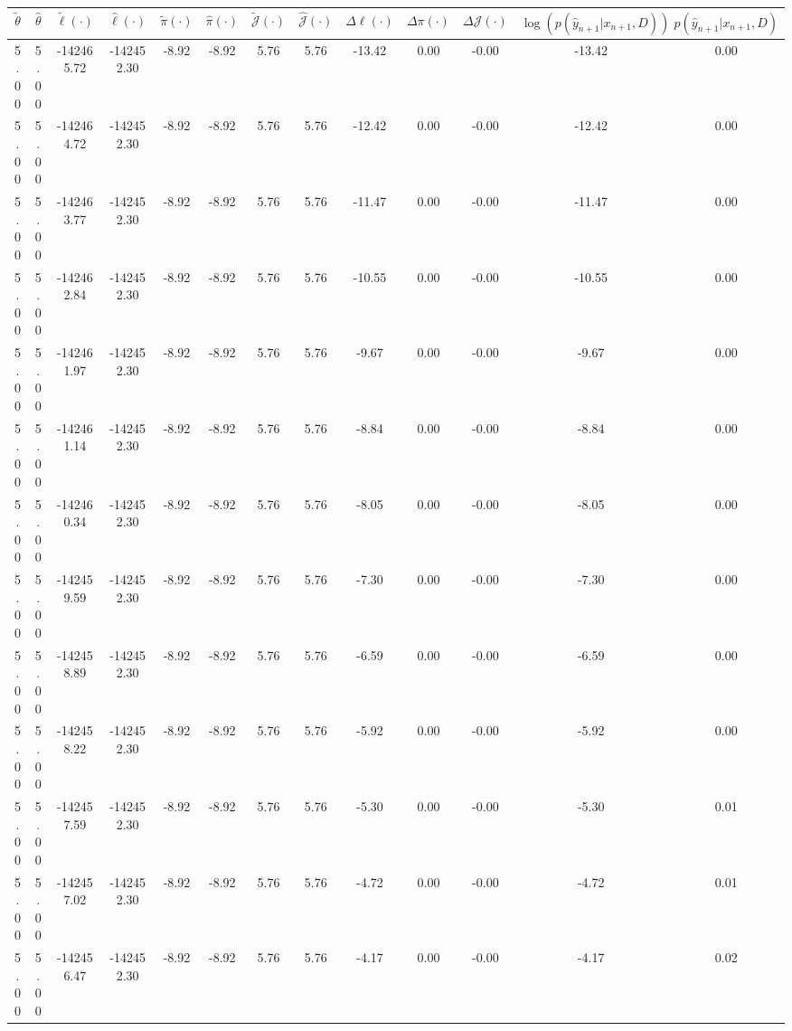 \begin{table}[htbp]
        \centering
        \tiny
        \begin{adjustbox}{angle=90}
            \begin{tabular}{|c|c|c|c|c|c|c|c|c|c|c|c|c|}
                \hline
                 $\tilde{\theta}$ & $\hat{\theta}$ & $\tilde{\ell}(\cdot)$ & $\hat{\ell}(\cdot)$ & $\tilde{\pi}(\cdot)$ & $\hat{\pi}(\cdot)$ & $\tilde{\mathcal{J}}(\cdot)$ & $\hat{\mathcal{J}}(\cdot)$ & $\Delta \ell(\cdot)$ & $\Delta \pi(\cdot)$ & $\Delta \mathcal{J}(\cdot)$ & $\log(p(\hat{y}_{n+1}|x_{n+1}, D))$ & $p(\hat{y}_{n+1}|x_{n+1}, D)$ \\
                \hline
                 5.00 & 5.00 & -142465.72 & -142452.30 & -8.92 & -8.92 & 5.76 & 5.76 & -13.42 & 0.00 & -0.00 & -13.42 & 0.00\\ \hline
 5.00 & 5.00 & -142464.72 & -142452.30 & -8.92 & -8.92 & 5.76 & 5.76 & -12.42 & 0.00 & -0.00 & -12.42 & 0.00\\ \hline
 5.00 & 5.00 & -142463.77 & -142452.30 & -8.92 & -8.92 & 5.76 & 5.76 & -11.47 & 0.00 & -0.00 & -11.47 & 0.00\\ \hline
 5.00 & 5.00 & -142462.84 & -142452.30 & -8.92 & -8.92 & 5.76 & 5.76 & -10.55 & 0.00 & -0.00 & -10.55 & 0.00\\ \hline
 5.00 & 5.00 & -142461.97 & -142452.30 & -8.92 & -8.92 & 5.76 & 5.76 & -9.67 & 0.00 & -0.00 & -9.67 & 0.00\\ \hline
 5.00 & 5.00 & -142461.14 & -142452.30 & -8.92 & -8.92 & 5.76 & 5.76 & -8.84 & 0.00 & -0.00 & -8.84 & 0.00\\ \hline
 5.00 & 5.00 & -142460.34 & -142452.30 & -8.92 & -8.92 & 5.76 & 5.76 & -8.05 & 0.00 & -0.00 & -8.05 & 0.00\\ \hline
 5.00 & 5.00 & -142459.59 & -142452.30 & -8.92 & -8.92 & 5.76 & 5.76 & -7.30 & 0.00 & -0.00 & -7.30 & 0.00\\ \hline
 5.00 & 5.00 & -142458.89 & -142452.30 & -8.92 & -8.92 & 5.76 & 5.76 & -6.59 & 0.00 & -0.00 & -6.59 & 0.00\\ \hline
 5.00 & 5.00 & -142458.22 & -142452.30 & -8.92 & -8.92 & 5.76 & 5.76 & -5.92 & 0.00 & -0.00 & -5.92 & 0.00\\ \hline
 5.00 & 5.00 & -142457.59 & -142452.30 & -8.92 & -8.92 & 5.76 & 5.76 & -5.30 & 0.00 & -0.00 & -5.30 & 0.01\\ \hline
 5.00 & 5.00 & -142457.02 & -142452.30 & -8.92 & -8.92 & 5.76 & 5.76 & -4.72 & 0.00 & -0.00 & -4.72 & 0.01\\ \hline
 5.00 & 5.00 & -142456.47 & -142452.30 & -8.92 & -8.92 & 5.76 & 5.76 & -4.17 & 0.00 & -0.00 & -4.17 & 0.02\\ \hline

\end{tabular}
\end{adjustbox}
\end{table}
